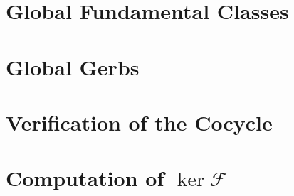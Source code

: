 \documentclass{article}
\numberwithin{equation}{section}
\begin{document}
\section{Global Fundamental Classes}


\section{Global Gerbs} \label{sec:global}


\printbibliography[title={References}]

\newpage
\appendix
\section{Verification of the Cocycle} \label{sec:verifycocycle}


\section{Computation of \texorpdfstring{$\ker\mathcal F$}{ker F}} \label{sec:havegensproof}

\end{document}
